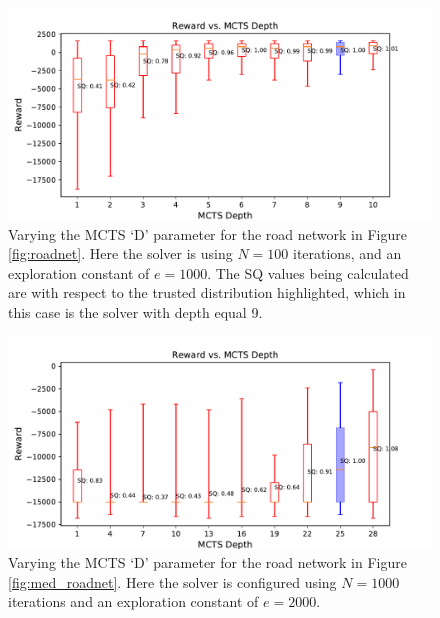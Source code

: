 \begin{figure}[tbp]
    \centering
    \includegraphics[width=0.6\linewidth]{Figures/sq_roadnet_mcts_i100e1000.pdf}
    \caption{Varying the MCTS `D' parameter for the road network in Figure \ref{fig:roadnet}. Here the solver is using $N=100$ iterations, and an exploration constant of $e=1000$. The SQ values being calculated are with respect to the trusted distribution highlighted, which in this case is the solver with depth equal 9.}
    \label{fig:mcts_d}
\end{figure}
\begin{figure}[tbp]
    \centering
    \includegraphics[width=0.6\linewidth]{Figures/sq_mednet_mcts_i1000e2000.pdf}
    \caption{Varying the MCTS `D' parameter for the road network in Figure \ref{fig:med_roadnet}. Here the solver is configured using $N=1000$ iterations and an exploration constant of $e=2000$.}
    \label{fig:mcts_d_med}
\end{figure}

